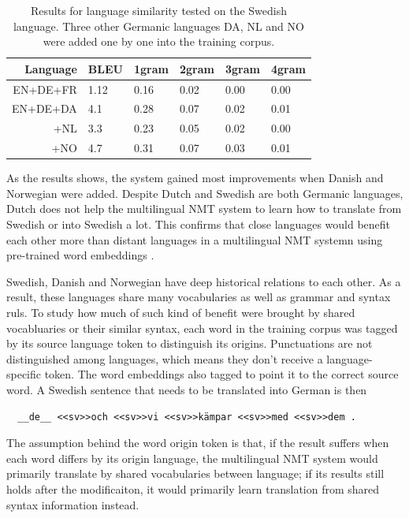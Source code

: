 \documentclass[thesis,fonts=libertine]{cluu}
\begin{document}
\begin{table}
  \centering
  \begin{tabular}{|r*{5}{|l}|}
  \hline
  Language & BLEU & 1gram & 2gram & 3gram & 4gram \\ [0.25ex]
  \hline\hline
  EN+DE+FR & 1.12 & 0.16 & 0.02 & 0.00 & 0.00 \\
  \hline
  EN+DE+DA & 4.1 & 0.28 & 0.07 & 0.02 & 0.01 \\
  \hline
  +NL & 3.3 & 0.23 & 0.05 & 0.02 & 0.00 \\ 
  \hline
  +NO & 4.7 & 0.31 & 0.07 & 0.03 & 0.01 \\
  \hline
  \end{tabular}
  \caption{Results for language similarity tested on the Swedish language. Three other Germanic languages DA, NL and NO were added one by one into the training corpus.}
  \label{table:language_similarity}
\end{table}

As the results shows, the system gained most improvements when Danish and Norwegian were added. Despite Dutch and Swedish are both Germanic languages, Dutch does not help the multilingual NMT system to learn how to translate from Swedish or into Swedish a lot. This confirms that close languages would benefit each other more than distant languages in a multilingual NMT systemn using pre-trained word embeddings \parencite{Qi:2018aa}.

Swedish, Danish and Norwegian have deep historical relations to each other. As a result, these languages share many vocabularies as well as grammar and syntax ruls. To study how much of such kind of benefit were brought by shared vocabluaries or their similar syntax, each word in the training corpus was tagged by its source language token to distinguish its origins. Punctuations are not distinguished among languages, which means they don't receive a language-specific token. The word embeddings also tagged to point it to the correct source word. A Swedish sentence that needs to be translated into German is then 

\begin{verbatim}
  __de__ <<sv>>och <<sv>>vi <<sv>>kämpar <<sv>>med <<sv>>dem .
\end{verbatim}

The assumption behind the word origin token is that, if the result suffers when each word differs by its origin language, the multilingual NMT system would primarily translate by shared vocabularies between language; if its results still holds after the modificaiton, it would primarily learn translation from shared syntax information instead.
\end{document}
